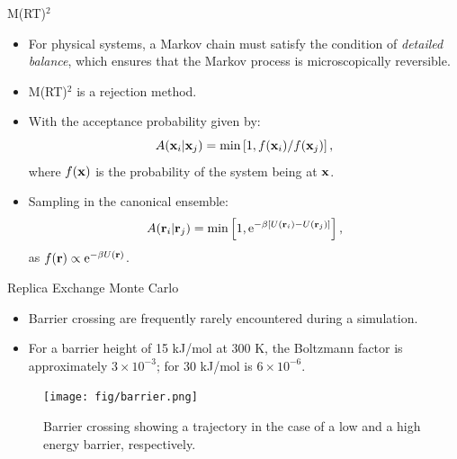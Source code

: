 \documentclass[10pt]{beamer}
\begin{document}
\begin{frame}{M(RT)$^2$}
\begin{itemize}
\setlength\itemsep{1em}
  \item For physical systems, a Markov chain must satisfy the condition of \textit{detailed balance}, which ensures that the Markov process is microscopically reversible.

  \item M(RT)$^2$ is a rejection method.

  \item With the acceptance probability given by:
  \begin{equation}
    A({\bf x}_i | {\bf x}_j) = \min\left[1, {f({\bf x}_i)}/{f({\bf x}_j)}\right],
  \end{equation}
  where $f({\bf x})$ is the probability of the system being at ${\bf x}$.

  \item Sampling in the canonical ensemble:
  \begin{equation}
    A({\bf r}_i | {\bf r}_j) = \min\left[1, \mathrm{e}^{-\beta \left[U({\bf r}_i)-U({\bf r}_j)\right]} \right],
  \end{equation}
  as $f({\bf r}) \propto \mathrm{e}^{-\beta U({\bf r})}$.
\end{itemize}
\end{frame}

\begin{frame}{Replica Exchange Monte Carlo}
\begin{itemize}
\setlength\itemsep{1em}
  \item Barrier crossing are frequently rarely encountered during a simulation.

  \item For a barrier height of 15 kJ/mol at 300 K, the Boltzmann factor is approximately $3\times 10^{-3}$; for 30 kJ/mol is $6\times 10^{-6}$.
\end{itemize}
\begin{figure}
  \texttt{[image: fig/barrier.png]}
  \caption{Barrier crossing showing a trajectory in the case of a low and a high energy barrier, respectively.}
\end{figure}
\end{frame}
\end{document}
